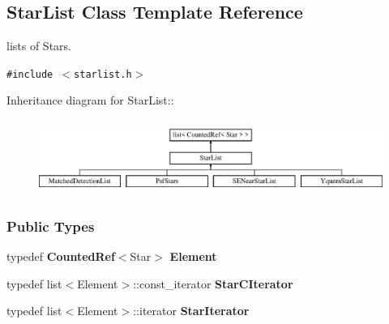 \subsection{Star\-List  Class Template Reference}
\label{class_starlist}
lists of Stars. 


{\tt \#include $<$starlist.h$>$}

Inheritance diagram for Star\-List::\begin{figure}[H]
\begin{center}
\leavevmode
\includegraphics[height=2.44186cm]{class_starlist}
\end{center}
\end{figure}
\subsubsection*{Public Types}
\begin{CompactItemize}
\item 
{}
typedef {\bf Counted\-Ref}$<$Star$>$ {\bf Element}\label{class_starlist_s0}

\item 
{}
typedef list$<$Element$>$::const\_\-iterator {\bf Star\-CIterator}\label{class_starlist_s1}

\item 
{}
typedef list$<$Element$>$::iterator {\bf Star\-Iterator}\label{class_starlist_s2}

\end{CompactItemize}

